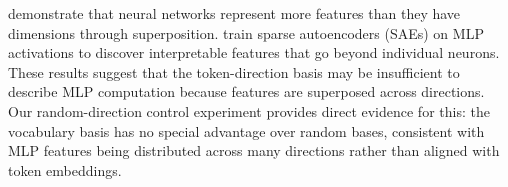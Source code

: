 \citet{elhage2022toy} demonstrate that neural networks represent more features than they have dimensions through superposition.
\citet{cunningham2023sparse} train sparse autoencoders (SAEs) on MLP activations to discover interpretable features that go beyond individual neurons.
These results suggest that the token-direction basis may be insufficient to describe MLP computation because features are superposed across directions.
Our random-direction control experiment provides direct evidence for this: the vocabulary basis has no special advantage over random bases, consistent with MLP features being distributed across many directions rather than aligned with token embeddings.
